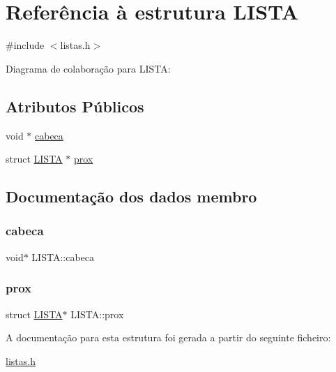 \hypertarget{structLISTA}{}\section{Referência à estrutura L\+I\+S\+TA}
\label{structLISTA}


{\ttfamily \#include $<$listas.\+h$>$}



Diagrama de colaboração para L\+I\+S\+TA\+:
\subsection*{Atributos Públicos}
\begin{DoxyCompactItemize}
\item 
void $\ast$ \hyperlink{structLISTA_afc2a9ff0ebe8d9523b437f8b8ecc8c50}{cabeca}
\item 
struct \hyperlink{structLISTA}{L\+I\+S\+TA} $\ast$ \hyperlink{structLISTA_a818a9fbd5f34b29597c140c052309ea6}{prox}
\end{DoxyCompactItemize}


\subsection{Documentação dos dados membro}
\mbox{\label{structLISTA_afc2a9ff0ebe8d9523b437f8b8ecc8c50}} 
\subsubsection{\texorpdfstring{cabeca}{cabeca}}
{\footnotesize\ttfamily void$\ast$ L\+I\+S\+T\+A\+::cabeca}

\mbox{\label{structLISTA_a818a9fbd5f34b29597c140c052309ea6}} 
\subsubsection{\texorpdfstring{prox}{prox}}
{\footnotesize\ttfamily struct \hyperlink{structLISTA}{L\+I\+S\+TA}$\ast$ L\+I\+S\+T\+A\+::prox}



A documentação para esta estrutura foi gerada a partir do seguinte ficheiro\+:\begin{DoxyCompactItemize}
\item 
\hyperlink{listas_8h}{listas.\+h}\end{DoxyCompactItemize}
